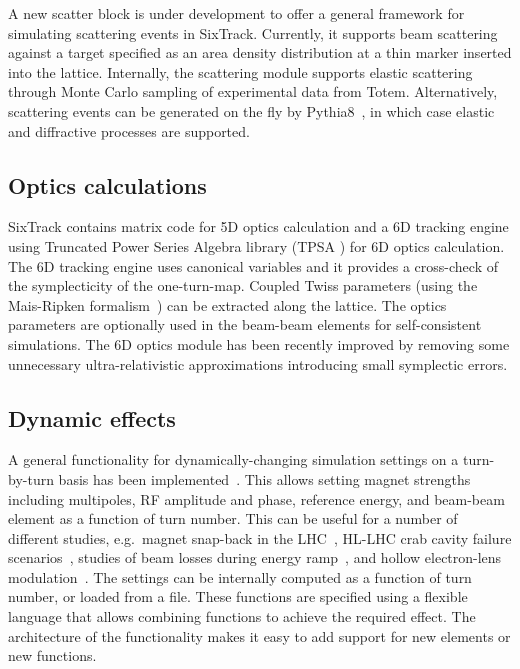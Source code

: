 \documentclass[a4paper,
              ]{jacow}
\begin{document}
A new scatter block is under development to offer a general framework for simulating scattering events in SixTrack. Currently, it supports beam scattering against a target specified as an area density distribution at a thin marker inserted into the lattice.
Internally, the scattering module supports elastic scattering through Monte Carlo sampling of experimental data from Totem. Alternatively, scattering events can be generated on the fly by Pythia8~\cite{pythia8}, in which case elastic and diffractive processes are supported.

\subsection{Optics calculations}

SixTrack contains matrix code for 5D optics calculation and a 6D tracking engine using Truncated Power Series Algebra library (TPSA \cite{tpsa}) for 6D optics calculation. The 6D tracking engine uses canonical variables and it provides a cross-check of the symplecticity of the one-turn-map. Coupled Twiss parameters (using the Mais-Ripken formalism~\cite{maisripken}) can be extracted along the lattice. The optics parameters are optionally used in the beam-beam elements for self-consistent simulations. The 6D optics module has been recently improved by removing some unnecessary ultra-relativistic approximations introducing small symplectic errors.

\subsection{Dynamic effects}

A general functionality for dynamically-changing simulation settings on a turn-by-turn basis has been implemented~\cite{dynk,dynk2}. This allows setting magnet strengths including multipoles, RF amplitude and phase, reference energy, and beam-beam element as a function of turn number. This can be useful for a number of different studies, e.g.\  magnet snap-back in the LHC~\cite{snapback_lhc}, HL-LHC crab cavity failure scenarios~\cite{crabfail1,crabfail2,crabfail3}, studies of beam losses during energy ramp~\cite{modulation}, and hollow electron-lens modulation~\cite{elens-miriam}. The settings can be internally computed as a function of turn number, or loaded from a file. These functions are specified using a flexible language that  allows combining functions to achieve the required effect. The architecture of the functionality makes it easy to add support for new elements or new functions.
\end{document}
